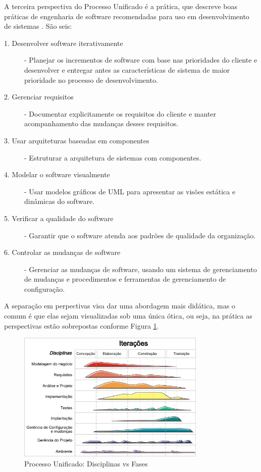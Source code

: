 \documentclass[
	article,			%
	11pt,				%
	oneside,			%
	a4paper,			%
	english,			%
	brazil,				%
	sumario=tradicional
	]{abntex2}
\begin{document}
A terceira perspectiva do Processo Unificado é a prática, que descreve boas
práticas de engenharia de software recomendadas para uso em desenvolvimento de
sistemas \cite{sommerville2007}. São seis:

\begin{description}
   \item[1. Desenvolver software iterativamente] - Planejar os incrementos de
   software com base nas prioridades do cliente e desenvolver e entregar antes
   as características de sistema de maior prioridade no processo de
   desenvolvimento.
   \item[2. Gerenciar requisitos] - Documentar explicitamente os requisitos do
   cliente e manter acompanhamento das mudanças desses requisitos.
   \item[3. Usar arquiteturas baseadas em componentes] - Estruturar a
   arquitetura de sistemas com componentes.
   \item[4. Modelar o software visualmente] - Usar modelos gráficos de UML para
   apresentar as visões estática e dinâmicas do software.
   \item[5. Verificar a qualidade do software] - Garantir que o software atenda
   aos padrões de qualidade da organização.
   \item[6. Controlar as mudanças de software] - Gerenciar as mudanças de
   software, usando um sistema de gerenciamento de mudanças e procedimentos e
   ferramentas de gerenciamento de configuração.
\end{description}

A separação em perpectivas visa dar uma abordagem mais didática, mas o comum é
que elas sejam visualizadas sob uma única ótica, ou seja, na prática as
perspectivas estão sobrepostas conforme Figura \ref{graficodasbaleias}.

\begin{figure}[ht!]
   \centering
   \includegraphics[width=90mm]{graficodasbaleias.jpg}
   \caption{Processo Unificado: Disciplinas vs Fases}
   \label{graficodasbaleias}
\end{figure}
\end{document}

